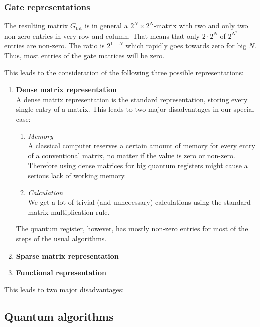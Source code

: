 \documentclass[bibliography=totocnumbered]{article}
\theoremstyle{NoticeStyle}
\begin{document}
\subsubsection{Gate representations}
The resulting matrix $G_\text{tot}$ is in general a $2^N \times 2^N$-matrix with two and only two non-zero entries in very row and column. That means that only $2\cdot 2^N$ of $2^{N^2}$ entries are non-zero. The ratio is $2^{1-N}$ which rapidly goes towards zero for big $N$. Thus, most entries of the gate matrices will be zero.

This leads to the consideration of the following three possible representations:
\begin{enumerate}
	\item \textbf{Dense matrix representation}\\
		A dense matrix representation is the standard representation, storing every single entry of a matrix. This leads to two major disadvantages in our special case:		
		\begin{enumerate}
			\item \textit{Memory}\\
			A classical computer reserves a certain amount of memory for every entry of a conventional matrix, no matter if the value is zero or non-zero. Therefore using dense matrices for big quantum registers might cause a serious lack of working memory.
			\item \textit{Calculation}\\
			We get a lot of trivial (and unnecessary) calculations using the standard matrix multiplication rule.
		\end{enumerate}
		The quantum register, however, has mostly non-zero entries for most of the steps of the usual algorithms.
	\item \textbf{Sparse matrix representation}\\
	
	\item \textbf{Functional representation}\\
\end{enumerate}


This leads to two major disadvantages:





\subsection{Quantum algorithms}\label{sec:Quantum algorithms}
\end{document}
